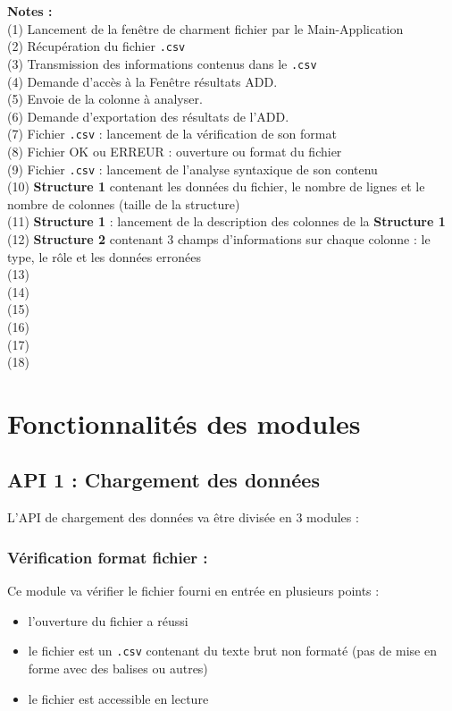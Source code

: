 		\hspace{-\parindent}\textbf{Notes :}\\
			(1) Lancement de la fenêtre de charment fichier par le Main-Application\\
			(2) Récupération du fichier \lstinline!.csv! \\
			(3) Transmission des informations contenus dans le \lstinline!.csv!\\
			(4) Demande d'accès à la Fenêtre résultats ADD.\\
			(5) Envoie de la colonne à analyser.\\
			(6) Demande d'exportation des résultats de l'ADD.\\
			(7) Fichier \lstinline!.csv! : lancement de la vérification de son format\\
			(8) Fichier OK ou ERREUR : ouverture ou format du fichier\\
			(9) Fichier \lstinline!.csv! : lancement de l'analyse syntaxique de son contenu\\
			(10) \textbf{Structure 1} contenant les données du fichier, le nombre de lignes et le nombre de colonnes (taille de la structure)\\
			(11) \textbf{Structure 1} : lancement de la description des colonnes de la \textbf{Structure 1}\\
			(12) \textbf{Structure 2} contenant 3 champs d'informations sur chaque colonne : le type, le rôle et les données erronées\\
			(13) \\
			(14) \\
			(15) \\
			(16) \\
			(17) \\
			(18) \\
	
	\section{Fonctionnalités des modules}
		\subsection{API 1 : Chargement des données}
			L'API de chargement des données va être divisée en 3 modules :
			
			\subsubsection{Vérification format fichier :}
				Ce module va vérifier le fichier fourni en entrée en plusieurs points :
				\begin{itemize}
					\item l'ouverture du fichier a réussi
					\item le fichier est un \lstinline!.csv! contenant du texte brut non formaté (pas de mise en forme avec des balises ou autres)
					\item le fichier est accessible en lecture
				\end{itemize}
			
